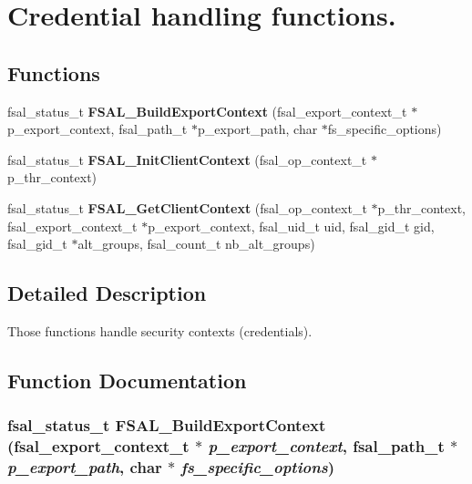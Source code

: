 \section{Credential handling functions.}
\label{group__FSALCredFunctions}
\subsection*{Functions}
\begin{CompactItemize}
\item 
fsal\_\-status\_\-t {\bf FSAL\_\-BuildExportContext} (fsal\_\-export\_\-context\_\-t $\ast$p\_\-export\_\-context, fsal\_\-path\_\-t $\ast$p\_\-export\_\-path, char $\ast$fs\_\-specific\_\-options)
\item 
fsal\_\-status\_\-t \textbf{FSAL\_\-InitClientContext} (fsal\_\-op\_\-context\_\-t $\ast$p\_\-thr\_\-context)\label{group__FSALCredFunctions_g9f4ac7f916d29b4a28556332e735143c}

\item 
fsal\_\-status\_\-t {\bf FSAL\_\-GetClientContext} (fsal\_\-op\_\-context\_\-t $\ast$p\_\-thr\_\-context, fsal\_\-export\_\-context\_\-t $\ast$p\_\-export\_\-context, fsal\_\-uid\_\-t uid, fsal\_\-gid\_\-t gid, fsal\_\-gid\_\-t $\ast$alt\_\-groups, fsal\_\-count\_\-t nb\_\-alt\_\-groups)
\end{CompactItemize}


\subsection{Detailed Description}
Those functions handle security contexts (credentials). 

\subsection{Function Documentation}
\subsubsection[{FSAL\_\-BuildExportContext}]{\setlength{\rightskip}{0pt plus 5cm}fsal\_\-status\_\-t FSAL\_\-BuildExportContext (fsal\_\-export\_\-context\_\-t $\ast$ {\em p\_\-export\_\-context}, \/  fsal\_\-path\_\-t $\ast$ {\em p\_\-export\_\-path}, \/  char $\ast$ {\em fs\_\-specific\_\-options})}\label{group__FSALCredFunctions_g8fc1d622ba0c6a798b1cc667bf273311}



